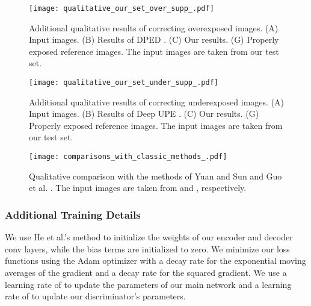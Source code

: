 \documentclass[final]{cvpr}
\begin{document}
  
 \begin{figure*}[t]
 \centering
 \texttt{[image: qualitative\_our\_set\_over\_supp\_.pdf]}
 \vspace{-2mm}
 \caption{Additional qualitative results of correcting overexposed images. (A) Input images. (B) Results of DPED \cite{DPED}. (C) Our results. (G) Properly exposed reference images. The input images are taken from our test set.\vspace{-2mm}}
 \label{fig:qualitative_our_set_over_supp}
 \end{figure*}
 
 \begin{figure*}[t]
 \centering
 \texttt{[image: qualitative\_our\_set\_under\_supp\_.pdf]}
 \vspace{-2mm}
 \caption{Additional qualitative results of correcting underexposed images. (A) Input images. (B) Results of Deep UPE \cite{DeepUPE}. (C) Our results. (G) Properly exposed reference images. The input images are taken from our test set.\vspace{-2mm}}
 \label{fig:qualitative_our_set_under_supp}
 \end{figure*}
 

 

 
 
 


 \begin{figure*}[t]
 \centering
 \texttt{[image: comparisons\_with\_classic\_methods\_.pdf]}
 \vspace{-2mm}
 \caption{Qualitative comparison with the methods of Yuan and Sun \cite{yuan2012automatic} and Guo et al. \cite{guo2010correcting}. The input images are taken from  \cite{yuan2012automatic} and \cite{guo2010correcting}, respectively.}
 \label{fig:comparisons_old_methods}
 \end{figure*}
 
 
 
 

 

 


\subsubsection{Additional Training Details}\label{subsec:training_details_supp} 
We use He et al.'s method \cite{he2015delving} to initialize the weights of our encoder and decoder conv layers, while the bias terms are initialized to zero. We minimize our loss functions using the Adam optimizer \cite{kingma2014adam} with a decay rate  for the exponential moving averages of the gradient and a decay rate  for the squared gradient. We use a learning rate of  to update the parameters of our main network and a learning rate of  to update our discriminator's parameters.
\end{document}
